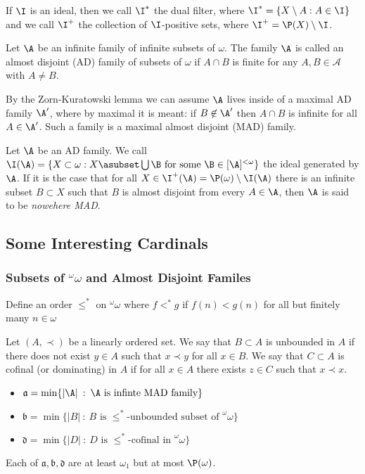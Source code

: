 \documentclass{article}
\begin{document}
If \(\I\) is an ideal, then we call \(\I^{\ast}\) the dual filter, where \(\I^{\ast} = \{X\setminus A : A \in \I\}\) and we call \(\I^+\) the collection of \(\I\)-positive sets, where \(\I^+ = \P(X)\setminus \I\).

\begin{defn}
    Let \(\A\) be an infinite family of infinite subsets of \(\omega\). The family \(\A\) is called an almost disjoint (AD) family of subsets of \(\omega\) if \(A \cap B \) is finite for any \(A,B \in \mathcal{A}\) with \(A \ne B\).
\end{defn}
By the Zorn-Kuratowski lemma we can assume \(\A\) lives inside of a maximal AD family \(\A'\), where by maximal it is meant: if \(B \not \in \A'\) then \(A\cap B\) is infinite for all \(A\in \A'\). Such a family is a maximal almost disjoint (MAD) family.

Let \(\A\) be an AD family. We call \(\I(\A) = \{X \subset \omega : X \asubset \bigcup\B \text{ for some } \B \in [\A]^{<\omega}\}\) the ideal generated by \(\A\).
If it is the case that for all \(X \in \I^+(\A) = \P(\omega) \setminus \I(\A)\) there is an infinite subset \(B \subset X\) such that \(B\) is almost disjoint from every \(A \in \A\), then \(\A\) is said to be \textit{nowehere MAD}. 

\subsection{Some Interesting Cardinals}
\subsubsection{Subsets of ${}^\omega\omega$ and Almost Disjoint Familes}

\begin{defn}
    Define an order \(\leq^{\ast}\) on \(^\omega\omega\) where \(f <^{\ast} g\) if \(f(n) < g(n)\) for all but finitely many \(n \in  \omega\)
\end{defn}
\begin{defn}
    Let \((A, \prec)\) be a linearly ordered set. We say that  \(B \subset A\) is unbounded in \(A\) if there does not exist \(y \in A\) such that \(x \prec y\) for all \(x \in B\). We say that \(C \subset A\) is cofinal (or dominating) in \(A\) if for all \(x \in A\) there exists \(z \in C\) such that \(x \prec x\).
\end{defn}
\begin{defn}
    \leavevmode
    \begin{itemize}
        \item \(\mathfrak{a} = \min\{|\A| \: : \: \A \text{ is infinte } \text{MAD family}\}\)
        \item \(\mathfrak{b} = \min\{|B| \: : \: B \text{ is } \leq^{\ast}\text{-unbounded subset of }^\omega\omega\}\)
        \item \(\mathfrak{d} = \min\{|D| \: : \: D \text{ is } \leq^{\ast}\text{-cofinal in } ^\omega\omega
        \}\)
    \end{itemize}
    Each of \(\mathfrak{a}, \mathfrak{b}, \mathfrak{d}\) are at least \(\omega_1\) but at most \(\P(\omega)\).
\end{defn}
\end{document}
